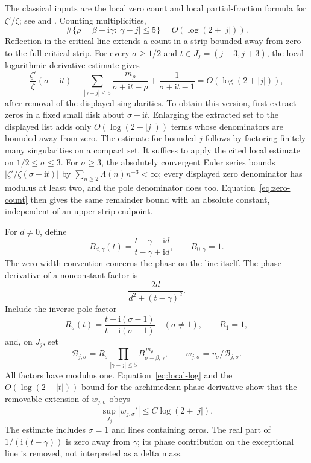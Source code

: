 \documentclass[11pt]{article}
\numberwithin{equation}{section}
\theoremstyle{definition}
\theoremstyle{remark}
\newcommand{\ii}{\mathrm i}
\begin{document}
The classical inputs are the local zero count and local partial-fraction
formula for \(\zeta'/\zeta\); see
\cite[Propositions 16 and 19]{Tao} and \cite{Elkies}.
Counting multiplicities,
\begin{equation}\label{eq:zero-count}
\#\{\rho=\beta+\ii\gamma:|\gamma-j|\le5\}
=O(\log(2+|j|)).
\end{equation}
Reflection in the critical line extends a count in a strip bounded
away from zero to the full critical strip.
For every \(\sigma\ge1/2\) and
\(t\in J_j=(j-3,j+3)\), the local logarithmic-derivative estimate gives
\begin{equation}\label{eq:local-log}
\frac{\zeta'}{\zeta}(\sigma+\ii t)
-\sum_{|\gamma-j|\le5}\frac{m_\rho}{\sigma+\ii t-\rho}
+\frac1{\sigma+\ii t-1}
=O(\log(2+|j|)),
\end{equation}
after removal of the displayed singularities.
To obtain this version, first extract zeros in a fixed small disk
about \(\sigma+\ii t\). Enlarging the extracted set to the
displayed list adds only \(O(\log(2+|j|))\) terms whose denominators
are bounded away from zero. The estimate for bounded \(j\) follows
by factoring finitely many singularities on a compact set.
It suffices to apply the cited local estimate on \(1/2\le\sigma\le3\).
For \(\sigma\ge3\), the absolutely convergent Euler series bounds
\(|\zeta'/\zeta(\sigma+\ii t)|\) by
\(\sum_{n\ge2}\Lambda(n)n^{-3}<\infty\); every displayed zero
denominator has modulus at least two, and the pole denominator does too.
Equation~\eqref{eq:zero-count} then gives the same remainder bound with
an absolute constant, independent of an upper strip endpoint.

For \(d\ne0\), define
\[
B_{d,\gamma}(t)=\frac{t-\gamma-\ii d}{t-\gamma+\ii d},
\qquad B_{0,\gamma}=1.
\]
The zero-width convention concerns the phase on the line itself.
The phase derivative of a nonconstant factor is
\begin{equation}\label{eq:Bderiv}
\frac{2d}{d^2+(t-\gamma)^2}.
\end{equation}
Include the inverse pole factor
\[
R_\sigma(t)=\frac{t+\ii(\sigma-1)}{t-\ii(\sigma-1)}
\quad(\sigma\ne1),\qquad R_1=1,
\]
and, on \(J_j\), set
\begin{equation}\label{eq:local-product}
\mathcal B_{j,\sigma}
=R_\sigma\prod_{|\gamma-j|\le5}
B_{\sigma-\beta,\gamma}^{\,m_\rho},
\qquad w_{j,\sigma}=v_\sigma/\mathcal B_{j,\sigma}.
\end{equation}
All factors have modulus one. Equation~\eqref{eq:local-log}
and the \(O(\log(2+|t|))\) bound for the archimedean phase derivative
show that the removable extension of \(w_{j,\sigma}\) obeys
\begin{equation}\label{eq:background}
\sup_{J_j}|w_{j,\sigma}'|
\le C\log(2+|j|).
\end{equation}
The estimate includes \(\sigma=1\) and lines containing zeros.
The real part of \(1/(\ii(t-\gamma))\) is zero away from
\(\gamma\); its phase contribution on the exceptional line is
removed, not interpreted as a delta mass.
\end{document}
